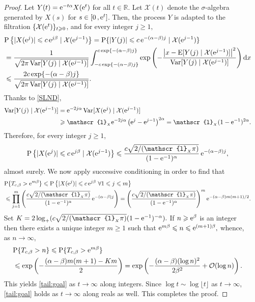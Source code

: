 \documentclass[reqno]{amsart}
\DeclareMathOperator{\Var}{Var}
\newcommand{\<}{\langle}
\renewcommand{\>}{\rangle}
\newcommand{\R}{\mathbb{R}}
\renewcommand{\P}{\mathrm{P}}
\newcommand{\E}{\mathrm{E}}
\newcommand{\1}{\mathbb{1}}
\renewcommand{\d}{{\rm d}}
\newcommand{\e}{{\rm e}}
\renewcommand{\ge}{\geqslant}
\renewcommand{\le}{\leqslant}
\theoremstyle{definition}
\numberwithin{equation}{section}
\begin{document}
\begin{proof}
	Let $Y(t)=\e^{-t\alpha}X(\e^t)$ for all $t\in\R$.
	Let $\mathcal{X}(t)$
	denote the $\sigma$-algebra generated by $X(s)$ for $s\in[0\,,\e^t]$.
	Then, the process $Y$ is adapted to the filtration 
	$\{\mathcal{X}(\e^t)\}_{t\ge0}$, and for every integer $j\ge1$,
	\begin{align*}
		&\P\left\{ |X(\e^j)| \le c\,\e^{j\beta} \mid \mathcal{X}(\e^{j-1})\right\} = 
			\P\{ |Y(j)|\le c\,\e^{-(\alpha-\beta)j} \mid \mathcal{X}(\e^{j-1}) \}\\
		&=\frac{1}{\sqrt{2\pi\Var[Y(j)\mid \mathcal{X}(\e^{j-1})]}}
			\int_{-c\exp\{-(\alpha-\beta)j\}}^{c\exp\{-(\alpha-\beta)j\}}\exp\left(
			-\frac{\left| x-\E[Y(j)\mid\mathcal{X}(\e^{j-1})] \right|^2}{
			\Var[Y(j)\mid\mathcal{X}(\e^{j-1})]}\right)\d x\\
		&\le \frac{2c \exp\{-(\alpha-\beta)j\}}{\sqrt{2\pi\Var[Y(j)\mid \mathcal{X}(\e^{j-1})]}}.
	\end{align*}
	Thanks to \eqref{SLND},
	\begin{align*}
		\Var[Y(j)\mid\mathcal{X}(\e^{j-1})] &= \e^{-2j\alpha}
		\Var[X(\e^j)\mid\mathcal{X}(\e^{j-1})]\\
		&\ge\mathscr{l}_{_X}\e^{-2j\alpha}\left(\e^j-\e^{j-1}\right)^{2\alpha}
		=\mathscr{l}_{_X}(1-\e^{-1})^{2\alpha}.
	\end{align*}
	Therefore, for every integer $j\ge1$,
	\[
		\P\left\{ |X(\e^j)| \le c\,\e^{j\beta} \mid \mathcal{X}(\e^{j-1})\right\}
		\le \frac{c\sqrt{2/(\mathscr{l}_{_X}\pi)}}{(1-\e^{-1})^\alpha}\,
		\e^{-(\alpha-\beta)j},
	\]
	almost surely. We now apply successive conditioning in order
	to find that
	\begin{align*}
		&\P\{T_{c,\beta}>\e^{m\beta}\}%
			\le \P\left\{ |X(\e^j)|\le c\,\e^{j\beta}\ \forall 1\le j\le m\right\}\\
		&\le \prod_{j=1}^m \left( \frac{c\sqrt{2/(\mathscr{l}_{_X}\pi)}}{(1-\e^{-1})^\alpha}\,
			\e^{-(\alpha-\beta)j}\right)
		= \left( \frac{c\sqrt{2/(\mathscr{l}_{_X}\pi)}}{(1-\e^{-1})^\alpha}\right)^m
			\e^{-(\alpha-\beta)m(m+1)/2}.
	\end{align*}
	Set $K = 2\log_+ ( c\sqrt{2/(\mathscr{l}_{_X}\pi)} (1-\e^{-1})^{-\alpha}).$
	If $n\ge\e^\beta$ is an integer then there exists a unique integer $m\ge1$ such that
	$\e^{m\beta} \le n\le \e^{(m+1)\beta},$
	whence, as $n\to\infty$,
	\begin{align*}
		&\P\{T_{c,\beta}>n\} \le \P\{T_{c,\beta}>\e^{m\beta}\}\\
		&\le  \exp\left( -\frac{(\alpha-\beta)m(m+1)-Km}{2}\right)
		= \exp\left( -\frac{(\alpha-\beta)(\log n)^2}{2\beta^2} 
		+ \mathcal{O}(\log n)\right).
	\end{align*}
	This yields \eqref{tail:goal} as $t\to\infty$ along integers.
	Since $\log t \sim \log\lfloor t\rfloor$ as $t\to\infty$, 
	\eqref{tail:goal} holds as $t\to\infty$ along reals as well.
	This completes the proof.
\end{proof}
\end{document}

